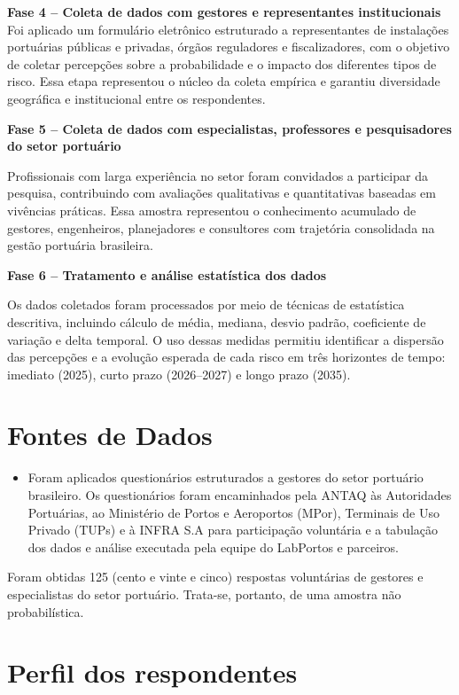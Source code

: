 \documentclass[
  portuguese,
  letterpaper,
  DIV=11,
  numbers=noendperiod]{scrreprt}
\providecommand{\tightlist}{%
  \setlength{\itemsep}{0pt}\setlength{\parskip}{0pt}}
\begin{document}
\textbf{Fase 4 -- Coleta de dados com gestores e representantes
institucionais} Foi aplicado um formulário eletrônico estruturado a
representantes de instalações portuárias públicas e privadas, órgãos
reguladores e fiscalizadores, com o objetivo de coletar percepções sobre
a probabilidade e o impacto dos diferentes tipos de risco. Essa etapa
representou o núcleo da coleta empírica e garantiu diversidade
geográfica e institucional entre os respondentes.

\textbf{Fase 5 -- Coleta de dados com especialistas, professores e
pesquisadores do setor portuário}

Profissionais com larga experiência no setor foram convidados a
participar da pesquisa, contribuindo com avaliações qualitativas e
quantitativas baseadas em vivências práticas. Essa amostra representou o
conhecimento acumulado de gestores, engenheiros, planejadores e
consultores com trajetória consolidada na gestão portuária brasileira.

\textbf{Fase 6 -- Tratamento e análise estatística dos dados}

Os dados coletados foram processados por meio de técnicas de estatística
descritiva, incluindo cálculo de média, mediana, desvio padrão,
coeficiente de variação e delta temporal. O uso dessas medidas permitiu
identificar a dispersão das percepções e a evolução esperada de cada
risco em três horizontes de tempo: imediato (2025), curto prazo
(2026--2027) e longo prazo (2035).

\section{Fontes de Dados}\label{fontes-de-dados}

\begin{itemize}
\tightlist
\item
  Foram aplicados questionários estruturados a gestores do setor
  portuário brasileiro. Os questionários foram encaminhados pela ANTAQ
  às Autoridades Portuárias, ao Ministério de Portos e Aeroportos
  (MPor), Terminais de Uso Privado (TUPs) e à INFRA S.A para
  participação voluntária e a tabulação dos dados e análise executada
  pela equipe do LabPortos e parceiros.
\end{itemize}

Foram obtidas 125 (cento e vinte e cinco) respostas voluntárias de
gestores e especialistas do setor portuário. Trata-se, portanto, de uma
amostra não probabilística.

\section{Perfil dos respondentes}\label{perfil-dos-respondentes}
\end{document}
